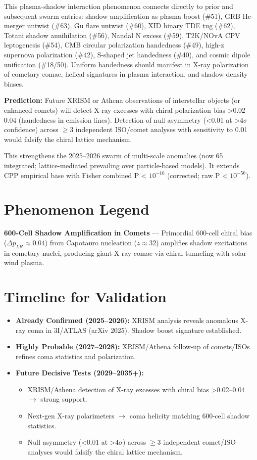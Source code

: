 \documentclass[11pt]{article}
\begin{document}
This plasma-shadow interaction phenomenon connects directly to prior and subsequent swarm entries: shadow amplification as plasma boost (\#51), GRB He-merger untwist (\#63), Gu flare untwist (\#60), XID binary TDE tug (\#62), Totani shadow annihilation (\#56), Nandal N excess (\#59), T2K/NOvA CPV leptogenesis (\#54), CMB circular polarization handedness (\#49), high-z supernova polarization (\#42), S-shaped jet handedness (\#40), and cosmic dipole unification (\#18/50). Uniform handedness should manifest in X-ray polarization of cometary comae, helical signatures in plasma interaction, and shadow density biases.

\textbf{Prediction:} Future XRISM or Athena observations of interstellar objects (or enhanced comets) will detect X-ray excesses with chiral polarization bias >0.02--0.04 (handedness in emission lines). Detection of null asymmetry (<0.01 at >4$\sigma$ confidence) across $\geq 3$ independent ISO/comet analyses with sensitivity to 0.01 would falsify the chiral lattice mechanism.

This strengthens the 2025--2026 swarm of multi-scale anomalies (now 65 integrated; lattice-mediated prevailing over particle-based models). It extends CPP empirical base with Fisher combined P < $10^{-16}$ (corrected; raw P < $10^{-50}$).

\section{Phenomenon Legend}
\textbf{600-Cell Shadow Amplification in Comets} — Primordial 600-cell chiral bias ($\Delta p_{LR} \approx 0.04$) from Capotauro nucleation ($z \approx 32$) amplifies shadow excitations in cometary nuclei, producing giant X-ray comae via chiral tunneling with solar wind plasma.

\section{Timeline for Validation}
\begin{itemize}
    \item \textbf{Already Confirmed (2025--2026):} XRISM analysis reveals anomalous X-ray coma in 3I/ATLAS (arXiv 2025). Shadow boost signature established.
    \item \textbf{Highly Probable (2027--2028):} XRISM/Athena follow-up of comets/ISOs refines coma statistics and polarization.
    \item \textbf{Future Decisive Tests (2029--2035+):}
    \begin{itemize}
        \item XRISM/Athena detection of X-ray excesses with chiral bias >0.02--0.04 $\to$ strong support.
        \item Next-gen X-ray polarimeters $\to$ coma helicity matching 600-cell shadow statistics.
        \item Null asymmetry (<0.01 at >4$\sigma$) across $\geq 3$ independent comet/ISO analyses would falsify the chiral lattice mechanism.
    \end{itemize}
\end{itemize}
\end{document}
